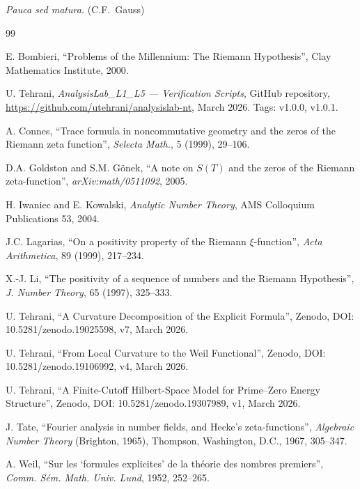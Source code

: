 \documentclass[11pt]{article}
\begin{document}
\noindent\textit{Pauca sed matura.} (C.F.\ Gauss)

\begin{thebibliography}{99}

E. Bombieri, ``Problems of the Millennium: The Riemann Hypothesis'',
Clay Mathematics Institute, 2000.

U. Tehrani, \emph{AnalysisLab\_L1\_L5 --- Verification Scripts},
GitHub repository,
\url{https://github.com/utehrani/analysislab-nt},
March 2026. Tags: v1.0.0, v1.0.1.

A. Connes, ``Trace formula in noncommutative geometry and the zeros
of the Riemann zeta function'',
\emph{Selecta Math.}, 5 (1999), 29--106.

D.A. Goldston and S.M. G\"onek,
``A note on $S(T)$ and the zeros of the Riemann zeta-function'',
\emph{arXiv:math/0511092}, 2005.

H. Iwaniec and E. Kowalski,
\emph{Analytic Number Theory},
AMS Colloquium Publications 53, 2004.

J.C. Lagarias,
``On a positivity property of the Riemann $\xi$-function'',
\emph{Acta Arithmetica}, 89 (1999), 217--234.

X.-J. Li,
``The positivity of a sequence of numbers and the Riemann Hypothesis'',
\emph{J. Number Theory}, 65 (1997), 325--333.

U. Tehrani,
``A Curvature Decomposition of the Explicit Formula'',
Zenodo, DOI: 10.5281/zenodo.19025598, v7, March 2026.

U. Tehrani,
``From Local Curvature to the Weil Functional'',
Zenodo, DOI: 10.5281/zenodo.19106992, v4, March 2026.

U. Tehrani,
``A Finite-Cutoff Hilbert-Space Model for Prime--Zero Energy Structure'',
Zenodo, DOI: 10.5281/zenodo.19307989, v1, March 2026.

J. Tate,
``Fourier analysis in number fields, and Hecke's zeta-functions'',
\emph{Algebraic Number Theory} (Brighton, 1965),
Thompson, Washington, D.C., 1967, 305--347.

A. Weil,
``Sur les `formules explicites' de la th\'eorie des nombres premiers'',
\emph{Comm. S\'em. Math. Univ. Lund}, 1952, 252--265.

\end{thebibliography}
\end{document}
